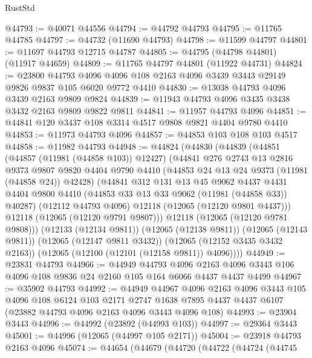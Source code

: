 \begin{lexlean}{RustStd}
\begin{coremodule}
@44793 := @40071 @44556
@44794 := @44792 @44793
@44795 := @11765 @44785
@44797 := @44732 (@11690 @44793)
@44798 := @11599 @44797
@44801 := @11697 @44793 @12715 @44787
@44805 := @44795 (@44798 @44801) (@11917 @44659)
@44809 := @11765 @44797 @44801 (@11922 @44731)
@44824 := @23800
    @44793
    @4096
    @4096
    @108
    @2163
    @4096
    @3439
    @3443
    @29149
    @9826
    @9837
    @105
    @6020
    @9772
    @4410
@44830 := @13038 @44793 @4096 @3439 @2163 @9809 @9824
@44839 := @11943 @44793 @4096 @3435 @3438 @3432 @2163 @9809 @9822 @9811
@44841 := @11957 @44793 @4096
@44851 := @44841 @120 @3437 @108 @3314 @4517 @9808 @9821 @4404 @9780 @4410
@44853 := @11973 @44793 @4096
@44857 := @44853 @103 @108 @103 @4517
@44858 := @11982 @44793
@44948 := @44824
    (@44830
      (@44839
        (@44851
          (@44857 (@11981 (@44858 @103)) @12427)
          (@44841
            @276
            @2743
            @13
            @2816
            @9373
            @9807
            @9820
            @4404
            @9790
            @4410
            (@44853 @24 @13 @24 @9373 (@11981 (@44858 @24)) @42428)
            (@44841
              @312
              @131
              @13
              @45
              @9062
              @4437
              @4431
              @4404
              @9800
              @4410
              (@44853 @33 @13 @33 @9062 (@11981 (@44858 @33)) @40287)
              (@12112 @44793 @4096)
              @12118
              (@12065 (@12120 @9801 @4437)))
            @12118
            (@12065 (@12120 @9791 @9807)))
          @12118
          (@12065 (@12120 @9781 @9808)))
        (@12133 (@12134 @9811))
        (@12065 (@12138 @9811))
        (@12065 (@12143 @9811))
        (@12065 (@12147 @9811 @3432))
        (@12065 (@12152 @3435 @3432 @2163))
        (@12065 (@12100 (@12101 (@12158 @9811)) @4096))))
@44949 := @23831 @44793
@44966 := @44949
    @44793
    @4096
    @2163
    @4096
    @3443
    @106
    @4096
    @108
    @9836
    @24
    @2160
    @105
    @164
    @6066
    @4437
    @4437
    @4499
@44967 := @35902 @44793
@44992 := @44949
    @44967
    @4096
    @2163
    @4096
    @3443
    @105
    @4096
    @108
    @6124
    @103
    @2171
    @2747
    @1638
    @7895
    @4437
    @4437
    @6107
    (@23882 @44793 @4096 @2163 @4096 @3443 @4096 @108)
@44993 := @23904 @3443
@44996 := @44992 (@23892 (@44993 @103))
@44997 := @29364 @3443
@45001 := @44996 (@12065 (@44997 @105 @2171))
@45004 := @23918 @44793 @2163 @4096
@45074 := @44654
    (@44679
      (@44720
        (@44722
          (@44724
            (@44745

\end{coremodule}
\end{lexlean}
